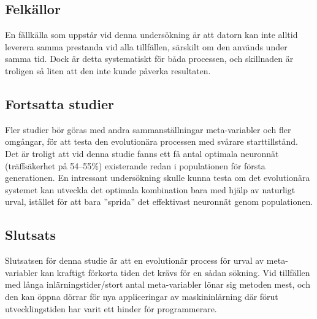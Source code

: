 \documentclass[a4paper, 12pt]{article}
\begin{document}
  \subsection{Felkällor}

  En fällkälla som uppstår vid denna undersökning är att datorn kan inte alltid leverera samma prestanda vid alla tillfällen, särskilt om den används under samma tid. Dock är detta systematiskt för båda processen, och skillnaden är troligen så liten att den inte kunde påverka resultaten.

  \subsection{Fortsatta studier}

  Fler studier bör göras med andra sammanställningar meta-variabler och fler omgångar, för att testa den evolutionära processen med svårare starttillstånd. Det är troligt att vid denna studie fanns ett få antal optimala neuronnät (träffsäkerhet på 54–55\%) existerande redan i populationen för första generationen. En intressant undersökning skulle kunna testa om det evolutionära systemet kan utveckla det optimala kombination bara med hjälp av naturligt urval, istället för att bara ”sprida” det effektivast neuronnät genom populationen.

  \subsection{Slutsats}

  Slutsatsen för denna studie är att en evolutionär process för urval av meta-variabler kan kraftigt förkorta tiden det krävs för en sådan sökning. Vid tillfällen med långa inlärningstider/stort antal meta-variabler lönar sig metoden mest, och den kan öppna dörrar för nya appliceringar av maskininlärning där förut utvecklingstiden har varit ett hinder för programmerare.


\printbibliography
\end{document}
